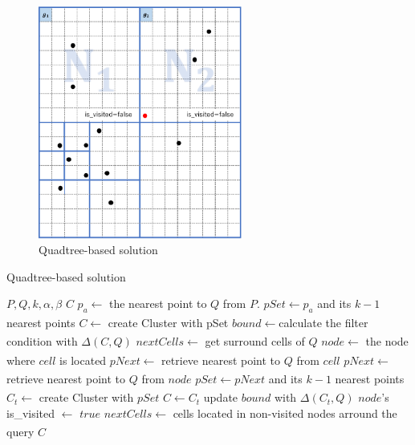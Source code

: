 \documentclass[a4paper,11pt]{report}
\theoremstyle{mytheoremstyle}
\begin{document}
\begin{figure}
    \begin{center}
        \includegraphics[width=0.6\textwidth]{images/solution-QuadTree2.pdf}
        \caption{Quadtree-based solution} \label{fig:solution-quadTree2}
    \end{center}
\end{figure}

\begin{algorithm}                      
\caption{Quadtree-based solution}         
\label{alg:quadtree}
\begin{algorithmic}[1]                  
\renewcommand{\algorithmicrequire}{\textbf{Input:}}
\renewcommand{\algorithmicensure}{\textbf{Output:}}
\REQUIRE $P,Q,k,\alpha, \beta$
\ENSURE $C$
\STATE $p_a \xleftarrow[]{}$ the nearest point to $Q$ from $P$.
\STATE $pSet \xleftarrow{} p_a$ and its $k-1$ nearest points
\STATE $C \xleftarrow[]{}$ create Cluster with pSet
\STATE $bound \xleftarrow[]{} $calculate the filter condition with $\Delta(C,Q)$
\STATE $nextCells \xleftarrow[]{} $ get surround cells of $Q$
\STATE $node \xleftarrow[]{}$ the node where $cell$ is located
\STATE $pNext \xleftarrow[]{}$ retrieve nearest point to $Q$ from $cell$
\ELSE
\STATE $pNext \xleftarrow[]{}$ retrieve nearest point to $Q$ from $node$
\ENDIF
\STATE $pSet \xleftarrow[]{} pNext$ and its $k-1$ nearest points
\STATE $C_t \xleftarrow{}$ create Cluster with $pSet$
\STATE $C \xleftarrow{} C_t$
\STATE update $bound$ with $\Delta(C_t,Q)$
\ENDIF
\STATE $node$'s is\_visited $\xleftarrow[]{}$ $true$
\ENDFOR
\STATE $nextCells \xleftarrow[]{} $ cells located in non-visited nodes arround the query
\ENDWHILE
\RETURN $C$
\end{algorithmic}
\end{algorithm}
\end{document}
